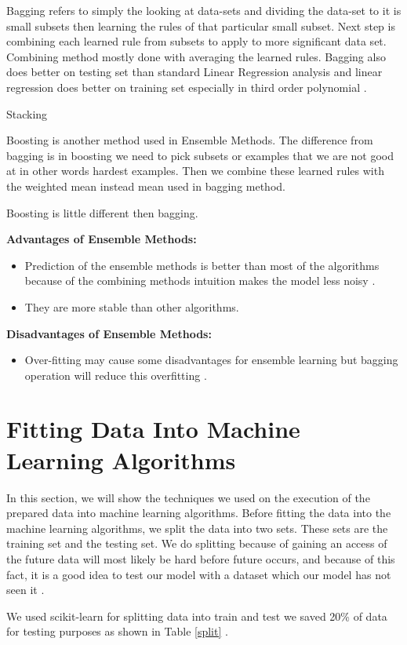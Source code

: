 \documentclass[sigconf]{acmart}
\begin{document}
\par Bagging refers to simply the looking at data-sets and dividing the data-set to it is small subsets then learning the rules of that particular small subset. Next step is combining each learned rule from subsets to apply to more significant data set. Combining method mostly done with averaging the learned rules. Bagging also does better on testing set than standard Linear Regression analysis and linear regression does better on training set especially in third order polynomial \cite{dietterich-ensemble}.  

\par Stacking 

\par Boosting is another method used in Ensemble Methods. The difference from bagging is in boosting we need to pick subsets or examples that we are not good at in other words hardest examples. Then we combine these learned rules with the weighted mean instead mean used in bagging method. 

\par Boosting is little different then bagging. 

\textbf{Advantages of Ensemble Methods:} 
\begin{itemize}
\item Prediction of the ensemble methods is better than most of the algorithms because of the combining methods intuition makes the model less noisy \cite{www-ensembleanalyticvidhya}. 
\item They are more stable than other algorithms. \cite{www-ensembleanalyticvidhya}
\end{itemize}

\textbf{Disadvantages of Ensemble Methods:}
\begin{itemize}
\item Over-fitting may cause some disadvantages for ensemble learning but bagging operation will reduce this overfitting \cite{www-ensembleanalyticvidhya}. 
\end{itemize}


\section{Fitting Data Into Machine Learning Algorithms}

In this section, we will show the techniques we used on the execution of the prepared data into machine learning algorithms. Before fitting the data into the machine learning algorithms, we split the data into two sets. These sets are the training set and the testing set. We do splitting because of gaining an access of the future data will most likely be hard before future occurs, and because of this fact, it is a good idea to test our model with a dataset which our model has not seen it \cite{www-salford}. 
\par We used scikit-learn for splitting data into train and test we saved 20\% of data for testing purposes as shown in Table \ref{split} . 
\end{document}
